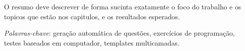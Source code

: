 \begin{resumo}
O resumo deve descrever de forma sucinta exatamente o foco do trabalho e os topicos que estão nos capitulos, e os resultados esperados.
 
  \bigbreak

  \noindent
  \textit{Palavras-chave}: geração automática de questões, exercícios de programação, testes baseados em computador, templates multicamadas.
\end{resumo}